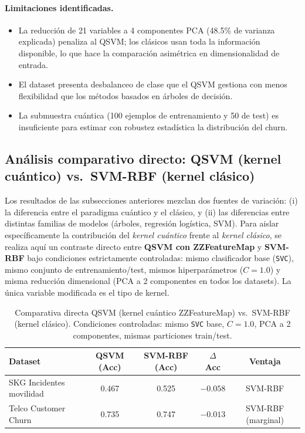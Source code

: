 \paragraph{Limitaciones identificadas.}
\begin{itemize}
  \item La reducción de 21 variables a 4 componentes PCA (48.5\% de varianza explicada) penaliza al QSVM; los clásicos usan toda la información disponible, lo que hace la comparación asimétrica en dimensionalidad de entrada.
  \item El dataset presenta desbalanceo de clase que el QSVM gestiona con menos flexibilidad que los métodos basados en árboles de decisión.
  \item La submuestra cuántica (100 ejemplos de entrenamiento y 50 de test) es insuficiente para estimar con robustez estadística la distribución del churn.
\end{itemize}

\subsection{Análisis comparativo directo: QSVM (kernel cuántico) vs.\ SVM-RBF (kernel clásico)}
\label{sec:qsvm_vs_svm_directo}

Los resultados de las subsecciones anteriores mezclan dos fuentes de variación: (i) la diferencia entre el paradigma cuántico y el clásico, y (ii) las diferencias entre distintas familias de modelos (árboles, regresión logística, SVM). Para aislar específicamente la contribución del \emph{kernel cuántico} frente al \emph{kernel clásico}, se realiza aquí un contraste directo entre \textbf{QSVM con ZZFeatureMap} y \textbf{SVM-RBF} bajo condiciones estrictamente controladas: mismo clasificador base (\texttt{SVC}), mismo conjunto de entrenamiento/test, mismos hiperparámetros ($C = 1.0$) y misma reducción dimensional (PCA a 2 componentes en todos los datasets). La única variable modificada es el tipo de kernel.

\begin{table}[ht]
\centering
\caption{Comparativa directa QSVM (kernel cuántico ZZFeatureMap) vs.\ SVM-RBF (kernel clásico). Condiciones controladas: mismo \texttt{SVC} base, $C=1.0$, PCA a 2 componentes, mismas particiones train/test.}
\label{tab:qsvm_vs_svm_directo}
\begin{tabularx}{\linewidth}{>{\raggedright\arraybackslash}Xcccc}
\toprule
\textbf{Dataset} & \textbf{QSVM (Acc)} & \textbf{SVM-RBF (Acc)} & \textbf{$\Delta$ Acc} & \textbf{Ventaja} \\
\midrule
SKG Incidentes movilidad   & 0.467 & 0.525 & $-0.058$ & SVM-RBF \\
Telco Customer Churn       & 0.735 & 0.747 & $-0.013$ & SVM-RBF (marginal) \\
\bottomrule
\end{tabularx}
\end{table}

